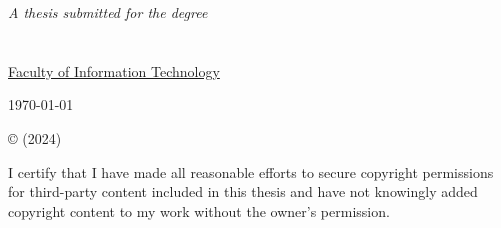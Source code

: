 \documentclass[
11pt, %
english, %
singlespacing, %
headsepline, %
]{MastersDoctoralThesis} %
\begin{document}
\begin{titlepage}
\begin{center}
\vfill

\large \textit{A thesis submitted for the degree  }\\[0.4cm] %
\groupname\\\deptname\\ %
\href{http://abc.com}{Faculty of Information Technology}\\[2cm]
 
\vfill

{\large \today}\\[4cm] %
 
\vfill
\end{center}
\end{titlepage}

\begin{copyright}
	
	© \authorname  (2024)
	
I certify that I have made all reasonable efforts to secure copyright permissions for third-party content included in this thesis and have not knowingly added copyright content to my work without the owner's permission.
	
\end{copyright}

\end{document}
